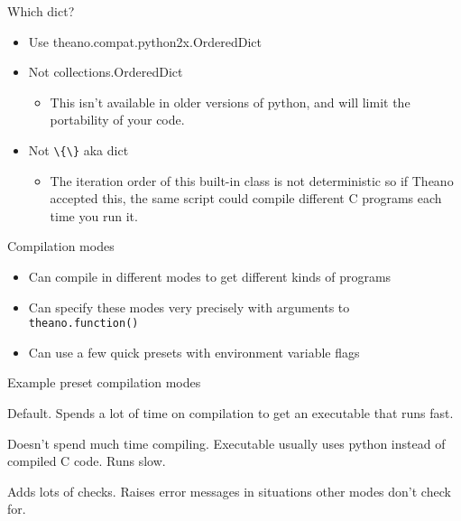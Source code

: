 \documentclass[utf8x,hyperref={pdfpagelabels=false}]{beamer}
\newcommand{\code}[1]{\lstinline[emph={[2]}]|#1|}
\begin{document}
\begin{frame}{Which dict?}
  \begin{itemize}
  \item Use theano.compat.python2x.OrderedDict
  \item Not collections.OrderedDict
  \begin{itemize}
  \item This isn’t available in older versions of python, and will limit the portability of your code.
  \end{itemize}
  \item Not \code{\{\}} aka dict
  \begin{itemize}
  \item The iteration order of this built-in class is not deterministic so if Theano accepted this, the same script could compile different C programs each time you run it.
  \end{itemize}
  \end{itemize}
\end{frame}

\begin{frame}{Compilation modes}
  \begin{itemize}
  \item Can compile in different modes to get different kinds of programs
  \item Can specify these modes very precisely with arguments to \code{theano.function()}
  \item Can use a few quick presets with environment variable flags
  \end{itemize}
\end{frame}

\begin{frame}{Example preset compilation modes}
  \begin{description}
  \item[FAST\_RUN] Default. Spends a lot of time on
compilation to get an executable that runs
fast.
  \item[FAST\_COMPILE] Doesn’t spend much time compiling.
Executable usually uses python
instead of compiled C code. Runs slow.
  \item[DEBUG\_MODE] Adds lots of checks.
Raises error messages in situations other modes don't check for.
  \end{description}
\end{frame}
\end{document}

